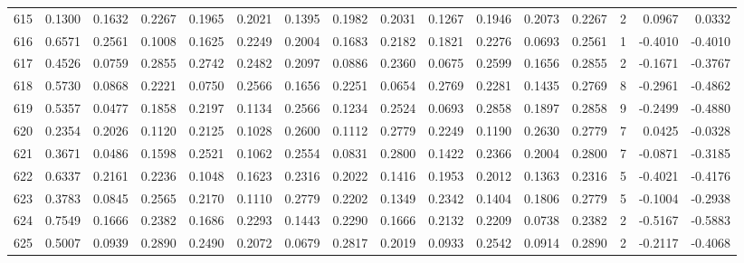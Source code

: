 \begin{tabular}{lrrrrrrrrrrrrrrr}
615 &      0.1300 &  0.1632 &  0.2267 &  0.1965 &  0.2021 &  0.1395 &  0.1982 &  0.2031 &  0.1267 &  0.1946 &   0.2073 &     0.2267 &      2 &                    0.0967 &                     0.0332 \\
616 &      0.6571 &  0.2561 &  0.1008 &  0.1625 &  0.2249 &  0.2004 &  0.1683 &  0.2182 &  0.1821 &  0.2276 &   0.0693 &     0.2561 &      1 &                   -0.4010 &                    -0.4010 \\
617 &      0.4526 &  0.0759 &  0.2855 &  0.2742 &  0.2482 &  0.2097 &  0.0886 &  0.2360 &  0.0675 &  0.2599 &   0.1656 &     0.2855 &      2 &                   -0.1671 &                    -0.3767 \\
618 &      0.5730 &  0.0868 &  0.2221 &  0.0750 &  0.2566 &  0.1656 &  0.2251 &  0.0654 &  0.2769 &  0.2281 &   0.1435 &     0.2769 &      8 &                   -0.2961 &                    -0.4862 \\
619 &      0.5357 &  0.0477 &  0.1858 &  0.2197 &  0.1134 &  0.2566 &  0.1234 &  0.2524 &  0.0693 &  0.2858 &   0.1897 &     0.2858 &      9 &                   -0.2499 &                    -0.4880 \\
620 &      0.2354 &  0.2026 &  0.1120 &  0.2125 &  0.1028 &  0.2600 &  0.1112 &  0.2779 &  0.2249 &  0.1190 &   0.2630 &     0.2779 &      7 &                    0.0425 &                    -0.0328 \\
621 &      0.3671 &  0.0486 &  0.1598 &  0.2521 &  0.1062 &  0.2554 &  0.0831 &  0.2800 &  0.1422 &  0.2366 &   0.2004 &     0.2800 &      7 &                   -0.0871 &                    -0.3185 \\
622 &      0.6337 &  0.2161 &  0.2236 &  0.1048 &  0.1623 &  0.2316 &  0.2022 &  0.1416 &  0.1953 &  0.2012 &   0.1363 &     0.2316 &      5 &                   -0.4021 &                    -0.4176 \\
623 &      0.3783 &  0.0845 &  0.2565 &  0.2170 &  0.1110 &  0.2779 &  0.2202 &  0.1349 &  0.2342 &  0.1404 &   0.1806 &     0.2779 &      5 &                   -0.1004 &                    -0.2938 \\
624 &      0.7549 &  0.1666 &  0.2382 &  0.1686 &  0.2293 &  0.1443 &  0.2290 &  0.1666 &  0.2132 &  0.2209 &   0.0738 &     0.2382 &      2 &                   -0.5167 &                    -0.5883 \\
625 &      0.5007 &  0.0939 &  0.2890 &  0.2490 &  0.2072 &  0.0679 &  0.2817 &  0.2019 &  0.0933 &  0.2542 &   0.0914 &     0.2890 &      2 &                   -0.2117 &                    -0.4068 \\

\end{tabular}
